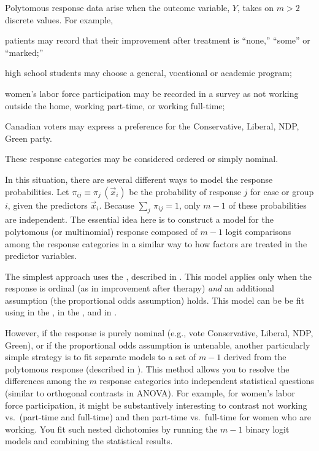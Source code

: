 \documentclass[11pt]{book}
\begin{document}
Polytomous response data arise when the outcome variable, $Y$,
takes on $m > 2$ discrete values.  For example, 
\begin{seriate}
 \item patients may record that their improvement after treatment is ``none,''
``some'' or ``marked;''
 \item high school students may choose a general, vocational or
academic program;
 \item women's labor force participation may be recorded in a survey
 as not working outside the home, working part-time, or working full-time;
 \item Canadian voters may express a preference for
the Conservative, Liberal, NDP, Green party.
\end{seriate}
These response categories may be considered ordered or simply
nominal.

In this situation, there are several different
ways to model the response probabilities.  Let \(\pi_{ij} \equiv
\pi_j \,  ( \vec{x}_i )\) be the probability of response $j$ for case
or group $i$, given the predictors $\vec{x}_i$.
Because \(\sum_j \,  \pi_{ij} = 1\), only \(m - 1\) of
these probabilities are independent.  The essential idea here is to
construct a model for the polytomous (or multinomial)
response composed of $m-1$
logit comparisons among the response categories in a similar way
to how factors are treated in the predictor variables.

The simplest approach uses
the 
, described in .
This model applies only when the response is ordinal
(as in improvement after therapy)
\emph{and} an additional assumption
(the proportional odds assumption) holds. 
This model can be be fit using  in the ,
 in the , and  in .

However, if the
response is purely nominal (e.g., vote Conservative, Liberal, NDP, Green),
or if the proportional odds assumption is untenable, another particularly
simple strategy is to fit separate models to a set of \(m - 1\)
 derived from the polytomous response
(described in ). 
This method allows you to resolve the differences
among the $m$ response categories into independent statistical questions
(similar to orthogonal contrasts in ANOVA).
For example, for women's labor force participation, it might be 
substantively interesting to contrast not working vs.\  (part-time and full-time)
and then part-time vs.\ full-time for women who are working.
You fit such nested
dichotomies by running the $m-1$ binary logit models and combining the
statistical results.
\end{document}
